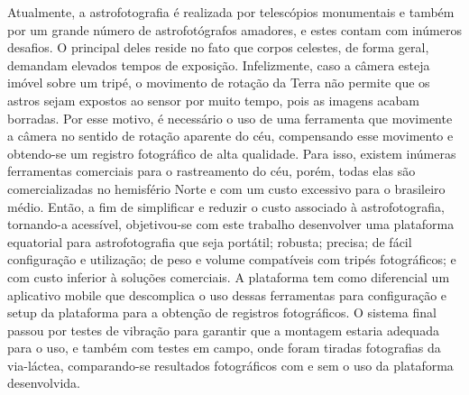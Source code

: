Atualmente, a astrofotografia é realizada por telescópios monumentais e também por um grande número de astrofotógrafos amadores, e estes contam com inúmeros desafios. O principal deles reside no fato que corpos celestes, de forma geral, demandam elevados tempos de exposição. Infelizmente, caso a câmera esteja imóvel sobre um tripé, o movimento de rotação da Terra não permite que os astros sejam expostos ao sensor por muito tempo, pois as imagens acabam borradas. Por esse motivo, é necessário o uso de uma ferramenta que movimente a câmera no sentido de rotação aparente do céu, compensando esse movimento e obtendo-se um registro fotográfico de alta qualidade. Para isso, existem inúmeras ferramentas comerciais para o rastreamento do céu, porém, todas elas são comercializadas no hemisfério Norte e com um custo excessivo para o brasileiro médio. Então, a fim de simplificar e reduzir o custo associado à astrofotografia, tornando-a acessível, objetivou-se com este trabalho desenvolver uma plataforma equatorial para astrofotografia que seja portátil; robusta; precisa; de fácil configuração e utilização; de peso e volume compatíveis com tripés fotográficos; e com custo inferior à soluções comerciais. A plataforma tem como diferencial um aplicativo mobile que descomplica o uso dessas ferramentas para configuração e setup da plataforma para a obtenção de registros fotográficos. O sistema final passou por testes de vibração para garantir que a montagem estaria adequada para o uso, e também com testes em campo, onde foram tiradas fotografias da via-láctea, comparando-se resultados fotográficos com e sem o uso da plataforma desenvolvida.

